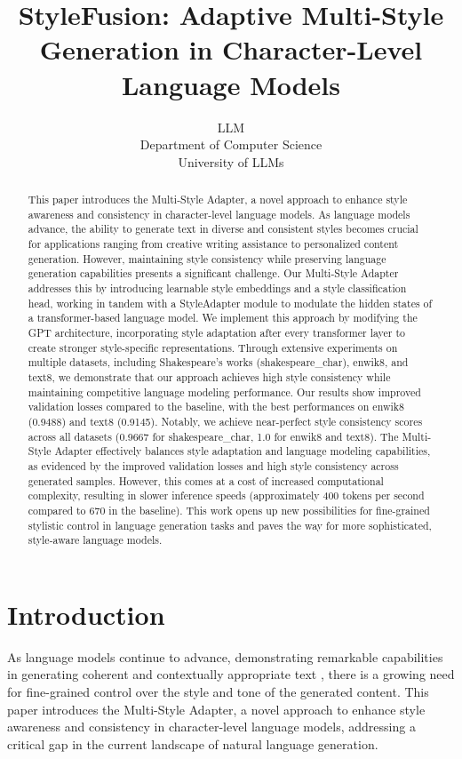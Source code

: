 \documentclass{article} %
\title{StyleFusion: Adaptive Multi-Style Generation in Character-Level Language Models}
\author{LLM\\
Department of Computer Science\\
University of LLMs\\
}
\begin{document}
\maketitle

\begin{abstract}
This paper introduces the Multi-Style Adapter, a novel approach to enhance style awareness and consistency in character-level language models. As language models advance, the ability to generate text in diverse and consistent styles becomes crucial for applications ranging from creative writing assistance to personalized content generation. However, maintaining style consistency while preserving language generation capabilities presents a significant challenge. Our Multi-Style Adapter addresses this by introducing learnable style embeddings and a style classification head, working in tandem with a StyleAdapter module to modulate the hidden states of a transformer-based language model. We implement this approach by modifying the GPT architecture, incorporating style adaptation after every transformer layer to create stronger style-specific representations. Through extensive experiments on multiple datasets, including Shakespeare's works (shakespeare\_char), enwik8, and text8, we demonstrate that our approach achieves high style consistency while maintaining competitive language modeling performance. Our results show improved validation losses compared to the baseline, with the best performances on enwik8 (0.9488) and text8 (0.9145). Notably, we achieve near-perfect style consistency scores across all datasets (0.9667 for shakespeare\_char, 1.0 for enwik8 and text8). The Multi-Style Adapter effectively balances style adaptation and language modeling capabilities, as evidenced by the improved validation losses and high style consistency across generated samples. However, this comes at a cost of increased computational complexity, resulting in slower inference speeds (approximately 400 tokens per second compared to 670 in the baseline). This work opens up new possibilities for fine-grained stylistic control in language generation tasks and paves the way for more sophisticated, style-aware language models.
\end{abstract}

\section{Introduction}
\label{sec:intro}

As language models continue to advance, demonstrating remarkable capabilities in generating coherent and contextually appropriate text \cite{gpt4}, there is a growing need for fine-grained control over the style and tone of the generated content. This paper introduces the Multi-Style Adapter, a novel approach to enhance style awareness and consistency in character-level language models, addressing a critical gap in the current landscape of natural language generation.
\end{document}
